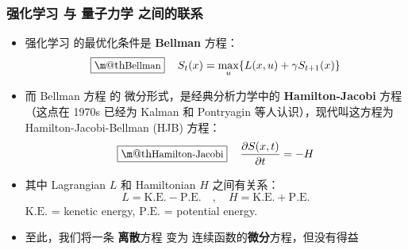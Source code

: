\documentclass[15pt]{beamer}
\makeatletter
\newcommand{\cc}[2]{#1}
\newcommand{\cc}[2]{#2}
\newcommand{\emp}[1]{{\color{violet}#1}}
\newcommand{\red}[1]{{\color{red}#1}}
\renewcommand{\boxed}[1]{\fbox{\m@th$\displaystyle\scalebox{0.9}{#1}$} \,}
\makeatother
\begin{document}
\begin{frame}
\frametitle{\cc{强化学习 与 量子力学 之间的联系}{Connection between reinforcement learning \& quantum mechanics}}

\begin{itemize}
	\item \cc{
	强化学习 的最优化条件是 \textbf{Bellman} 方程：}{
	The optimal condition for reinforcement learning is the \emp{Bellman} equation:
	}
		\begin{equation}
			\boxed{\mbox{Bellman}} \quad S_t(x) = \max_u \{ L(x,u) + \gamma S_{t+1}(x) \}
		\end{equation}
		
	\item \cc{
	而 Bellman 方程 的 微分形式，是经典分析力学中的 \textbf{Hamilton-Jacobi} 方程 （这点在 1970s 已经为 Kalman 和 Pontryagin 等人认识），现代叫这方程为 Hamilton-Jacobi-Bellman (HJB) 方程：}{
	The differential version of Bellman equation is the \emp{Hamilton-Jacobi} equation in classical analytic mechanics (This has been recognized in 1970's by Kalman, Pontryagin and others):
	}
		\begin{equation}
			\boxed{\mbox{Hamilton-Jacobi}} \quad \frac{\partial S(x, t)}{\partial t} = -H
		\end{equation}
		
	\item \cc{
	其中 Lagrangian $L$ 和 Hamiltonian $H$ 之间有关系：}{
	The Lagrangian $L$ and Hamiltionian $H$ are closely related:
	}
	\begin{equation}
		L = \text{K.E.} - \text{P.E.} \quad , \quad H = \text{K.E.} + \text{P.E.}
	\end{equation}
		$\text{K.E.}$ = kenetic energy, $\text{P.E.}$ = potential energy.

	\item \cc{
	至此，我们将一条 \textbf{离散}方程 变为 连续函数的\textbf{微分}方程，但\red{没有得益}}{
	Up to now, we changed a \emp{discrete} equation to a continuos \emp{differential} equation, but that has not yielded any advantage
	}
	
\end{itemize}
\end{frame}
\end{document}
